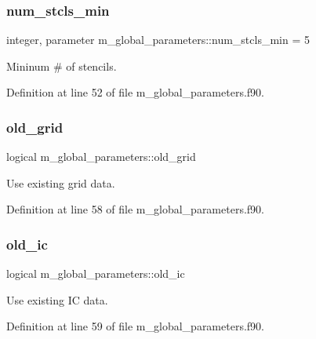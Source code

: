 \subsubsection{\texorpdfstring{num\+\_\+stcls\+\_\+min}{num\_stcls\_min}}
{\footnotesize\ttfamily integer, parameter m\+\_\+global\+\_\+parameters\+::num\+\_\+stcls\+\_\+min = 5}



Mininum \# of stencils. 



Definition at line 52 of file m\+\_\+global\+\_\+parameters.\+f90.

\mbox{\label{namespacem__global__parameters_a971692c50b4725d4724238b8a01a722e}} 
\subsubsection{\texorpdfstring{old\+\_\+grid}{old\_grid}}
{\footnotesize\ttfamily logical m\+\_\+global\+\_\+parameters\+::old\+\_\+grid}



Use existing grid data. 



Definition at line 58 of file m\+\_\+global\+\_\+parameters.\+f90.

\mbox{\label{namespacem__global__parameters_ae83688439601a9ff9bad58f09357a721}} 
\subsubsection{\texorpdfstring{old\+\_\+ic}{old\_ic}}
{\footnotesize\ttfamily logical m\+\_\+global\+\_\+parameters\+::old\+\_\+ic}



Use existing IC data. 



Definition at line 59 of file m\+\_\+global\+\_\+parameters.\+f90.

\mbox{\label{namespacem__global__parameters_ae152b49c742928bc52f6da61dd805693}} 
